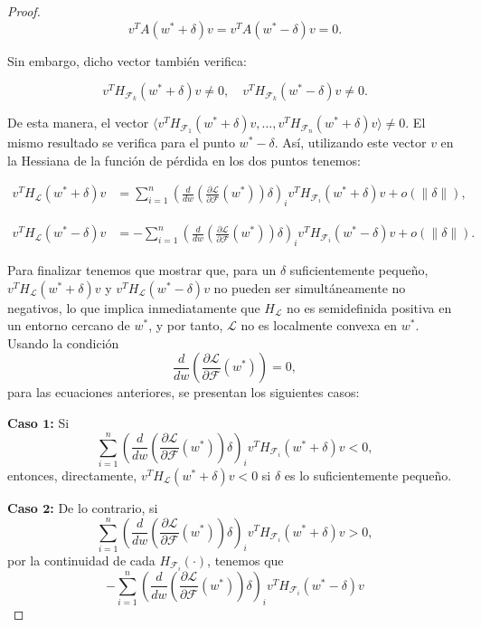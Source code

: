 \begin{proof}
    \[
        v^T A( w^* + \delta)  v =  v^T A( w^* - \delta)  v = 0.
    \]

    Sin embargo, dicho vector también verifica:

    \[
        v^T H_{\mathcal{F}_k}( w^* + \delta)  v \neq 0, \quad  v^T H_{\mathcal{F}_k}( w^* - \delta)  v \neq 0.
    \]

    De esta manera, el vector $ \langle v^T H_{\mathcal{F}_1}( w^*+\delta)  v, \dots,  v^T H_{\mathcal{F}_n}( w^*+\delta)  v \rangle \neq 0$. El mismo resultado se verifica para el punto $w^* - \delta$. Así, utilizando este vector $v$ en la Hessiana de la función de pérdida en los dos puntos tenemos:

    \begin{align}
        v^T H_{\mathcal{L}}( w^* + \delta)v &=  
        \sum_{i=1}^{n} \left( \frac{d}{d w} \left( \frac{\partial \mathcal{L}}{\partial \mathcal{F}}( w^*) \right) \delta \right)_i v^T H_{\mathcal{F}_i}( w^* + \delta) v + o(\|\delta\|),
    \end{align}

    \begin{align}
        v^T H_{\mathcal{L}}( w^* - \delta)v &=  
        - \sum_{i=1}^{n} \left( \frac{d}{d w} \left( \frac{\partial \mathcal{L}}{\partial \mathcal{F}}( w^*) \right) \delta \right)_i v^T H_{\mathcal{F}_i}( w^* - \delta) v + o(\|\delta\|).
    \end{align}

    Para finalizar tenemos que mostrar que, para un $\delta$ suficientemente pequeño, $v^T H_{\mathcal{L}}(w^* + \delta) v$ y $v^T H_{\mathcal{L}}(w^* - \delta) v$ no pueden ser simultáneamente no negativos, lo que implica inmediatamente que $H_{\mathcal{L}}$ no es semidefinida positiva en un entorno cercano de $w^*$, y por tanto, $\mathcal{L}$ no es localmente convexa en $w^*$. Usando la condición 
    \[
    \frac{d}{dw} (\frac{\partial \mathcal{L}}{\partial \mathcal{F}}(w^*)) = 0,
    \]
    para las ecuaciones anteriores, se presentan los siguientes casos:

    \textbf{Caso $\boldsymbol{1}$:} Si 
    \[
    \sum_{i=1}^{n} \left( \frac{d}{dw} (\frac{\partial \mathcal{L}}{\partial \mathcal{F}}(w^*))\delta \right)_i v^T H_{\mathcal{F}_i}(w^* + \delta) v < 0,
    \]
    entonces, directamente, $v^T H_{\mathcal{L}}(w^* + \delta) v < 0$ si $\delta$ es lo suficientemente pequeño.

    \textbf{Caso $\boldsymbol{2}$:} De lo contrario, si 
    \[
    \sum_{i=1}^{n} \left( \frac{d}{dw} (\frac{\partial \mathcal{L}}{\partial \mathcal{F}}(w^*))\delta \right)_i v^T H_{\mathcal{F}_i}(w^* + \delta) v > 0,
    \]
    por la continuidad de cada $H_{\mathcal{F}_i}(\cdot)$, tenemos que
    \[
        -\sum_{i=1}^{n} \left( \frac{d}{dw} (\frac{\partial \mathcal{L}}{\partial \mathcal{F}}(w^*))\delta \right)_i v^T H_{\mathcal{F}_i}(w^* - \delta) v
    \]


\end{proof}
